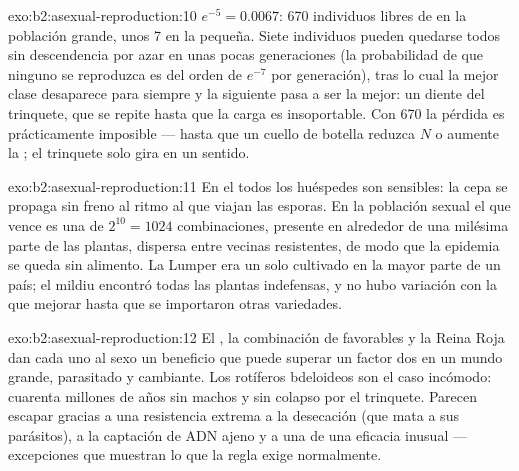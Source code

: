 \begin{solution}{exo:b2:asexual-reproduction:10}
$e^{-5} = 0.0067$: 670 individuos libres de  en la población
grande, unos 7 en la pequeña. Siete individuos pueden quedarse todos sin
descendencia por azar en unas pocas generaciones (la probabilidad de que
ninguno se reproduzca es del orden de $e^{-7}$ por generación), tras lo
cual la mejor clase desaparece para siempre y la siguiente pasa a ser la
mejor: un diente del trinquete, que se repite hasta que la carga es
insoportable. Con 670 la pérdida es prácticamente imposible --- hasta que
un cuello de botella reduzca $N$ o aumente la ; el
trinquete solo gira en un sentido.
\end{solution}

\begin{solution}{exo:b2:asexual-reproduction:11}
En el  todos los huéspedes son sensibles: la cepa se propaga sin
freno al ritmo al que viajan las esporas. En la población sexual el
 que vence es una de $2^{10} = 1024$ combinaciones, presente en
alrededor de una milésima parte de las plantas, dispersa entre vecinas
resistentes, de modo que la epidemia se queda sin alimento. La Lumper era
un solo  cultivado en la mayor parte de un país; el mildiu encontró
todas las plantas indefensas, y no hubo variación con la que mejorar
hasta que se importaron otras variedades.
\end{solution}

\begin{solution}{exo:b2:asexual-reproduction:12}
El , la combinación de  favorables y la
Reina Roja dan cada uno al sexo un beneficio que puede superar un factor
dos en un mundo grande, parasitado y cambiante. Los rotíferos bdeloideos
son el caso incómodo: cuarenta millones de años sin machos y sin colapso
por el trinquete. Parecen escapar gracias a una resistencia extrema a la
desecación (que mata a sus parásitos), a la captación de ADN ajeno y a
una  de una eficacia inusual --- excepciones que
muestran lo que la regla exige normalmente.
\end{solution}

